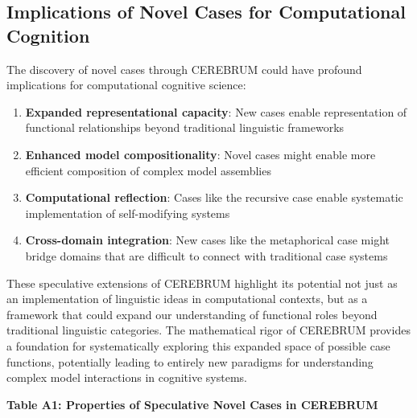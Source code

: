 \documentclass[
]{book}
\providecommand{\tightlist}{%
  \setlength{\itemsep}{0pt}\setlength{\parskip}{0pt}}
\begin{document}
\hypertarget{implications-of-novel-cases-for-computational-cognition}{%
\subsection{Implications of Novel Cases for Computational
Cognition}\label{implications-of-novel-cases-for-computational-cognition}}

The discovery of novel cases through CEREBRUM could have profound
implications for computational cognitive science:

\begin{enumerate}
\def\labelenumi{\arabic{enumi}.}
\tightlist
\item
  \textbf{Expanded representational capacity}: New cases enable
  representation of functional relationships beyond traditional
  linguistic frameworks
\item
  \textbf{Enhanced model compositionality}: Novel cases might enable
  more efficient composition of complex model assemblies
\item
  \textbf{Computational reflection}: Cases like the recursive case
  enable systematic implementation of self-modifying systems
\item
  \textbf{Cross-domain integration}: New cases like the metaphorical
  case might bridge domains that are difficult to connect with
  traditional case systems
\end{enumerate}

These speculative extensions of CEREBRUM highlight its potential not
just as an implementation of linguistic ideas in computational contexts,
but as a framework that could expand our understanding of functional
roles beyond traditional linguistic categories. The mathematical rigor
of CEREBRUM provides a foundation for systematically exploring this
expanded space of possible case functions, potentially leading to
entirely new paradigms for understanding complex model interactions in
cognitive systems.

\textbf{Table A1: Properties of Speculative Novel Cases in CEREBRUM}
\end{document}
